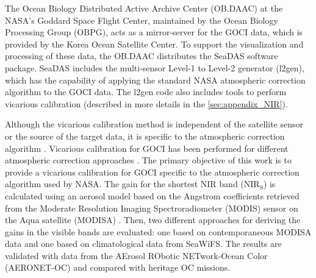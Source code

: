 \documentclass[]{interact}
\theoremstyle{plain}%
\theoremstyle{definition}
\theoremstyle{remark}
\begin{document}
The Ocean Biology Distributed Active Archive Center (OB.DAAC) at the NASA's Goddard Space Flight Center, maintained by the Ocean Biology Processing Group (OBPG), acts as a mirror-server for the GOCI data, which is provided by the Korea Ocean Satellite Center.  To support the visualization and processing of these data, the OB.DAAC distributes the SeaDAS software package.  SeaDAS includes the multi-sensor Level-1 to Level-2 generator (l2gen), which has the capability of applying the standard NASA atmospheric correction algorithm to the GOCI data. The l2gen code also includes tools to perform vicarious calibration (described in more details in the \autoref{sec:appendix_NIR}). 

Although the vicarious calibration method is independent of the satellite sensor or the source of the target data, it is specific to the atmospheric correction algorithm \citep{Franz:07}. Vicarious calibration for GOCI has been performed for different atmospheric correction approaches \citep{Ahn2015,Wang:13}. The primary objective of this work is to provide a vicarious calibration for GOCI specific to the atmospheric correction algorithm used by NASA. The gain for the shortest NIR band ($\text{NIR}_\text{S}$) is calculated using an aerosol model based on the Angstrom coefficients retrieved from the Moderate Resolution Imaging Spectroradiometer (MODIS) sensor on the Aqua satellite (MODISA) \citep{Esaias1998}. Then, two different approaches for deriving the gains in the visible bands are evaluated: one based on contemporaneous MODISA data and one based on climatological data from SeaWiFS. The results are validated with data from the AErosol RObotic NETwork-Ocean Color (AERONET-OC) \citep{Zibordi2009} and compared with heritage OC missions. 

\end{document}
